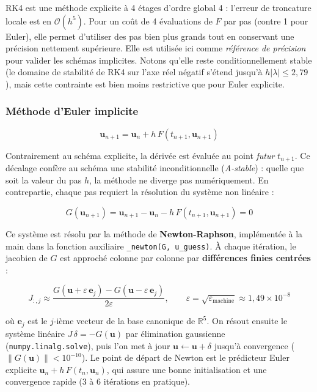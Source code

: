 \documentclass[12pt,a4paper]{article}
\begin{document}
RK4 est une méthode explicite à 4 étages d'ordre global 4 : l'erreur de troncature
locale est en $\mathcal{O}(h^5)$. Pour un coût de 4 évaluations de $F$ par pas (contre 1
pour Euler), elle permet d'utiliser des pas bien plus grands tout en conservant une
précision nettement supérieure. Elle est utilisée ici comme \emph{référence de précision}
pour valider les schémas implicites. Notons qu'elle reste conditionnellement stable (le
domaine de stabilité de RK4 sur l'axe réel négatif s'étend jusqu'à $h|\lambda| \leq 2{,}79$),
mais cette contrainte est bien moins restrictive que pour Euler explicite.

\subsubsection{Méthode d'Euler implicite}

\[
\mathbf{u}_{n+1} = \mathbf{u}_n + h\, F(t_{n+1}, \mathbf{u}_{n+1})
\]

Contrairement au schéma explicite, la dérivée est évaluée au point \emph{futur}
$t_{n+1}$. Ce décalage confère au schéma une stabilité inconditionnelle (\emph{A-stable}) :
quelle que soit la valeur du pas $h$, la méthode ne diverge pas numériquement. En
contrepartie, chaque pas requiert la résolution du système non linéaire :

\[
G(\mathbf{u}_{n+1}) = \mathbf{u}_{n+1} - \mathbf{u}_n - h\, F(t_{n+1}, \mathbf{u}_{n+1}) = 0
\]

Ce système est résolu par la méthode de \textbf{Newton-Raphson}, implémentée à la main
dans la fonction auxiliaire \texttt{\_newton(G, u\_guess)}. À chaque itération, le
jacobien de $G$ est approché colonne par colonne par \textbf{différences finies centrées} :

\[
J_{:,j} \approx \frac{G(\mathbf{u} + \varepsilon\, \mathbf{e}_j) - G(\mathbf{u} - \varepsilon\, \mathbf{e}_j)}{2\varepsilon},
\qquad \varepsilon = \sqrt{\varepsilon_{\text{machine}}} \approx 1{,}49 \times 10^{-8}
\]

où $\mathbf{e}_j$ est le $j$-ième vecteur de la base canonique de $\mathbb{R}^5$. On
résout ensuite le système linéaire $J\,\delta = -G(\mathbf{u})$ par élimination gaussienne
(\texttt{numpy.linalg.solve}), puis l'on met à jour $\mathbf{u} \leftarrow \mathbf{u} +
\delta$ jusqu'à convergence ($\|G(\mathbf{u})\| < 10^{-10}$). Le point de départ de Newton
est le prédicteur Euler explicite $\mathbf{u}_n + h\, F(t_n, \mathbf{u}_n)$, qui assure
une bonne initialisation et une convergence rapide (3 à 6 itérations en pratique).
\end{document}
